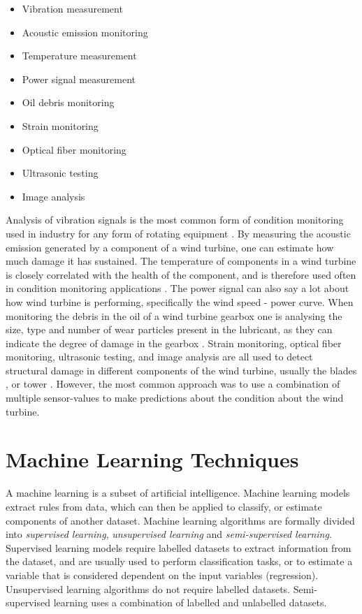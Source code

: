 \begin{itemize}
    \item Vibration measurement  
    \item Acoustic emission monitoring 
    \item Temperature measurement 
    \item Power signal measurement 
    \item Oil debris monitoring 
    \item Strain monitoring 
    \item Optical fiber monitoring 
    \item Ultrasonic testing 
    \item Image analysis
\end{itemize}

Analysis of vibration signals is the most common form of condition monitoring used in industry for any form of rotating equipment \cite{wt_bearing_cm_review}. 
By measuring the acoustic emission generated by a component of a wind turbine, one can estimate how much damage it has sustained. 
The temperature of components in a wind turbine is closely correlated with the health of the component, and is therefore used often in condition monitoring applications \cite{DBN_chicken_swarm_optim}. 
The power signal can also say a lot about how wind turbine is performing, specifically the wind speed - power curve. 
When monitoring the debris in the oil of a wind turbine gearbox one is analysing the size, type and number of wear particles present in the lubricant, as they can indicate the degree of damage in the gearbox \cite{cm_rnn_lstm}. 
Strain monitoring, optical fiber monitoring, ultrasonic testing, and image analysis are all used to detect structural damage in different components of the wind turbine, usually the blades \cite{lin_and_non_lin_feat_for_ice_detection_on_blades, image_based_surface_damage_detection_DL_drone_inspection,image_based_YOLO_YSODA, dirt_n_mud_detection_using_guided_waves,blade_defect_detection_imaging_array, unsupervised_AD_blade_damage_deep_features_images}, or tower \cite{wt_cm_rev_new_trends_chal_2014}. 
However, the most common approach was to use a combination of multiple sensor-values to make predictions about the condition about the wind turbine.

\section{Machine Learning Techniques}
A machine learning is a subset of artificial intelligence. 
Machine learning models extract rules from data, which can then be applied to classify, or estimate components of another dataset. 
Machine learning algorithms are formally divided into \textit{supervised learning}, \textit{unsupervised learning} and \textit{semi-supervised learning}. 
Supervised learning models require labelled datasets to extract information from the dataset, and are usually used to perform classification tasks, or to estimate a variable that is considered dependent on the input variables (regression). 
Unsupervised learning algorithms do not require labelled datasets. 
Semi-supervised learning uses a combination of labelled and unlabelled datasets. \bigskip

